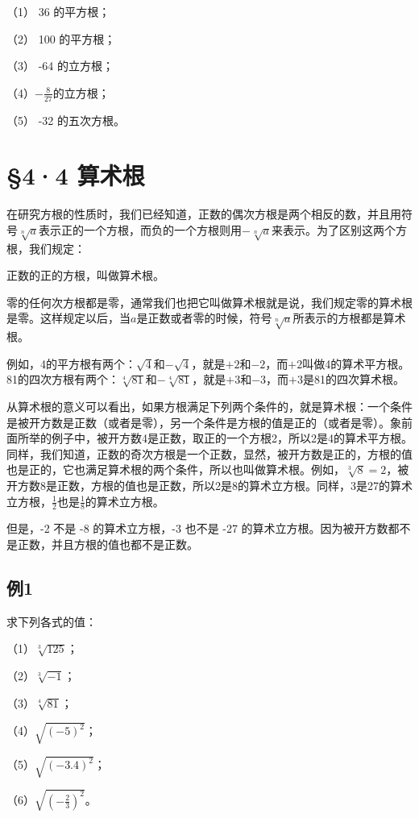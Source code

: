 （1） 36 的平方根；

（2） 100 的平方根；

（3） -64 的立方根；

（4）\(-\frac{8}{27}\)的立方根；

（5） -32 的五次方根。

\section{§4·4 算术根}

在研究方根的性质时，我们已经知道，正数的偶次方根是两个相反的数，并且用符号\(\sqrt[n]{a}\)表示正的一个方根，而负的一个方根则用\(-\sqrt[n]{a}\)来表示。为了区别这两个方根，我们规定：

正数的正的方根，叫做算术根。

零的任何次方根都是零，通常我们也把它叫做算术根就是说，我们规定零的算术根是零。这样规定以后，当\(a\)是正数或者零的时候，符号\(\sqrt[n]{a}\)所表示的方根都是算术根。

例如，4的平方根有两个：\(\sqrt{4}\)和\(-\sqrt{4}\)，就是\(+2\)和\(-2\)，而\(+2\)叫做4的算术平方根。81的四次方根有两个：\(\sqrt[4]{81}\)和\(-\sqrt[4]{81}\)，就是\(+3\)和\(-3\)，而\(+3\)是81的四次算术根。

从算术根的意义可以看出，如果方根满足下列两个条件的，就是算术根：一个条件是被开方数是正数（或者是零），另一个条件是方根的值是正的（或者是零）。象前面所举的例子中，被开方数4是正数，取正的一个方根2，所以2是4的算术平方根。同样，我们知道，正数的奇次方根是一个正数，显然，被开方数是正的，方根的值也是正的，它也满足算术根的两个条件，所以也叫做算术根。例如，\(\sqrt[3]{8} = 2\)，被开方数8是正数，方根的值也是正数，所以2是8的算术立方根。同样，3是27的算术立方根，\(\frac{1}{2}\)也是\(\frac{1}{8}\)的算术立方根。

但是，-2 不是 -8 的算术立方根，-3 也不是 -27
的算术立方根。因为被开方数都不是正数，并且方根的值也都不是正数。

\subsection{例1}

求下列各式的值：

（1）\(\sqrt[3]{125}\)；

（2）\(\sqrt[3]{-1}\)；

（3）\(\sqrt[4]{81}\)；

（4）\(\sqrt{(-5)^2}\)；

（5）\(\sqrt{(-3.4)^2}\)；

（6）\(\sqrt{\left(-\frac{2}{3}\right)^2}\)。

